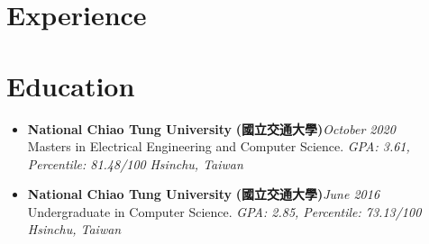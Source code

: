 \section{Experience}
\fi
\section{\sectionheading Education}

\begin{itemize}[leftmargin=0pt, label={}]%

\item{
{\sectionheading\large{\textbf{National Chiao Tung University}}} \textbf{(國立交通大學)}\hfill {\sectionheading\small{\textit{October 2020}}}\\
{\sectionheading\small{Masters in Electrical Engineering and Computer Science.}}
{\sectionheading\small{\textit{GPA: 3.61, Percentile: 81.48/100}}}
\hfill{\sectionheading\small{\textit{Hsinchu, Taiwan}}}

}

\item{
{\sectionheading\large{\textbf{National Chiao Tung University}}} \textbf{(國立交通大學)}\hfill {\sectionheading\small{\textit{June 2016}}}\\
{\sectionheading\small{Undergraduate in Computer Science.}}
{\sectionheading\small{\textit{GPA: 2.85, Percentile: 73.13/100}}}
\hfill{\sectionheading\small{\textit{Hsinchu, Taiwan}}}

}

\end{itemize}

